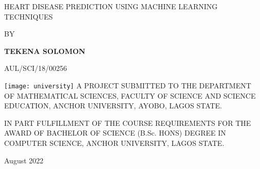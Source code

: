 \begin{titlepage}
	\begin{center}
		\vspace*{1cm}
		
		\large{HEART DISEASE PREDICTION USING MACHINE LEARNING TECHNIQUES}
		
		
		\vspace*{1cm}
		BY
		
		\vspace{1.5cm}
		
		\large{\textbf{TEKENA SOLOMON}}
		
		\vspace{0.5cm}
		AUL/SCI/18/00256
		
		\vfill
		\texttt{[image: university]}
		\vfill
		{A PROJECT SUBMITTED TO THE DEPARTMENT OF MATHEMATICAL SCIENCES, FACULTY OF SCIENCE AND SCIENCE EDUCATION, ANCHOR UNIVERSITY, AYOBO, LAGOS STATE.}
		\vfill
		
		{IN PART FULFILLMENT OF THE COURSE REQUIREMENTS FOR THE AWARD OF BACHELOR OF SCIENCE (B.Sc. HONS) DEGREE IN COMPUTER SCIENCE, ANCHOR UNIVERSITY, LAGOS STATE.
		}
		\vspace{0.8cm}


		
		\vspace{0.8cm}
		

  
    August  2022
		
	\end{center}
\end{titlepage}
